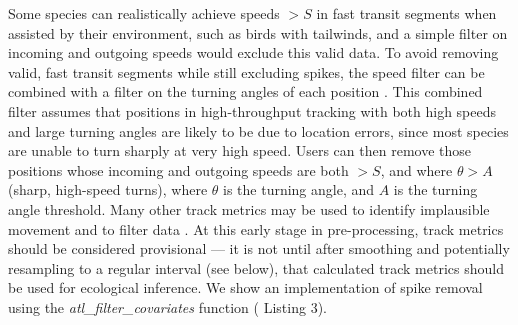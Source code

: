 \begin{refsection}[sorting=nyt]
    Some species can realistically achieve speeds $> S$ in fast transit segments when assisted by their environment, such as birds with tailwinds, and a simple filter on incoming and outgoing speeds would exclude this valid data.
    To avoid removing valid, fast transit segments while still excluding spikes, the speed filter can be combined with a filter on the turning angles of each position \citep[see][]{bjorneraas2010, calenge2009}.
    This combined filter assumes that positions in high-throughput tracking with both high speeds and large turning angles are likely to be due to location errors, since most species are unable to turn sharply at very high speed.
    Users can then remove those positions whose incoming and outgoing speeds are both $> S$, and where $\theta > A$ (sharp, high-speed turns), where $\theta$ is the turning angle, and $A$ is the turning angle threshold.
    Many other track metrics may be used to identify implausible movement and to filter data \citep{seidel2018}.
    At this early stage in pre-processing, track metrics should be considered provisional --- it is not until after smoothing and potentially resampling to a regular interval (see below), that calculated track metrics should be used for ecological inference.
    We show an implementation of spike removal using the \textit{atl\_filter\_covariates} function ({\color{red} Listing} 3).




\end{refsection}
